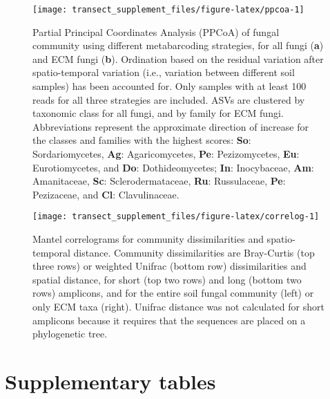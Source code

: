\documentclass[
]{article}
\begin{document}
\begin{figure}

{\centering \texttt{[image: transect\_supplement\_files/figure-latex/ppcoa-1]} 

}

\caption[Partial Principal Coordinates Analysis (PPCoA) of fungal community using different metabarcoding strategies]{Partial Principal Coordinates Analysis (PPCoA) of fungal community using different metabarcoding strategies, for all fungi (\textbf{a}) and ECM fungi (\textbf{b}).
Ordination based on the residual variation after spatio-temporal variation (i.e., variation between different soil samples) has been accounted for.
Only samples with at least 100 reads for all three strategies are included.
ASVs are clustered by taxonomic class for all fungi, and by family for ECM fungi.
Abbreviations represent the approximate direction of increase for the classes and families with the highest scores: \textbf{So}: Sordariomycetes, \textbf{Ag}: Agaricomycetes, \textbf{Pe}: Pezizomycetes, \textbf{Eu}: Eurotiomycetes, and \textbf{Do}: Dothideomycetes; \textbf{In}: Inocybaceae, \textbf{Am}: Amanitaceae, \textbf{Sc}: Sclerodermataceae, \textbf{Ru}: Russulaceae, \textbf{Pe}: Pezizaceae, and \textbf{Cl}: Clavulinaceae.}\label{fig:ppcoa}
\end{figure}





\begin{figure}

{\centering \texttt{[image: transect\_supplement\_files/figure-latex/correlog-1]} 

}

\caption[Mantel correlograms for community dissimilarities and spatio-temporal distance]{Mantel correlograms for community dissimilarities and spatio-temporal distance. Community dissimilarities are Bray-Curtis (top three rows) or weighted Unifrac (bottom row) dissimilarities and spatial distance, for short (top two rows) and long (bottom two rows) amplicons, and for the entire soil fungal community (left) or only ECM taxa (right). Unifrac distance was not calculated for short amplicons because it requires that the sequences are placed on a phylogenetic tree.}\label{fig:correlog}
\end{figure}

\FloatBarrier

\hypertarget{supplementary-tables}{%
\section{Supplementary tables}\label{supplementary-tables}}
\end{document}
